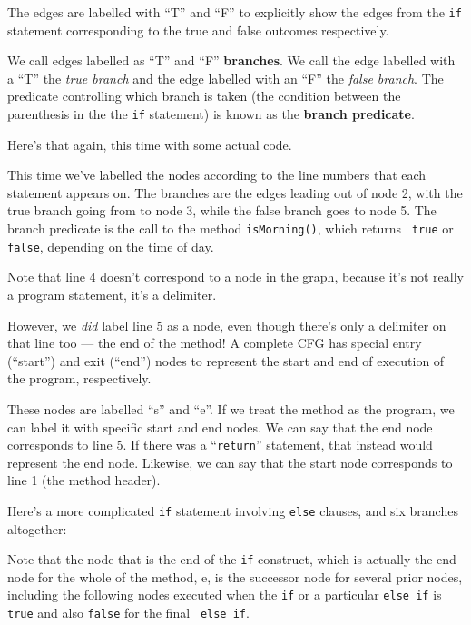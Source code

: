 The edges are labelled with ``T'' and ``F'' to explicitly show the edges from
the {\tt if} statement corresponding to the true and false outcomes
respectively.

We call edges labelled as ``T'' and ``F'' {\bf branches}. We call the edge
labelled with a ``T'' the {\it true branch} and the edge labelled with an ``F''
the {\it false branch}. The predicate controlling which branch is taken (the
condition between the parenthesis in the the {\tt if} statement) is known as the
{\bf branch predicate}.


Here's that again, this time with some actual code. 


This time we've labelled the nodes according to the line numbers that each
statement appears on. The branches are the edges leading out of node 2, with the
true branch going from to node 3, while the false branch goes to node 5. The
branch predicate is the call to the method {\tt isMorning()}, which returns {\tt
true} or {\tt false}, depending on the time of day.

Note that line 4 doesn't correspond to a node in the graph, because it's not
really a program statement, it's a delimiter.

However, we {\it did} label line 5 as a node, even though there's only a
delimiter on that line too --- the end of the method! A complete CFG has special
entry (``start'') and exit (``end'') nodes to represent the start and end of
execution of the program, respectively. 


These nodes are labelled ``s'' and ``e''. If we treat the method as the program,
we can label it with specific start and end nodes. We can say that the end node
corresponds to line 5. If there was a ``{\tt return}'' statement, that
instead would represent the end node. Likewise, we can say that the start node
corresponds to line 1 (the method header).


Here's a more complicated {\tt if} statement involving {\tt else} clauses, and
six branches altogether:


Note that the node that is the end of the {\tt if} construct, which is actually
the end node for the whole of the method, e, is the successor node for several
prior nodes, including the following nodes executed when the {\tt if} or a
particular {\tt else if} is {\tt true} and also {\tt false} for the final {\tt
else if}.

